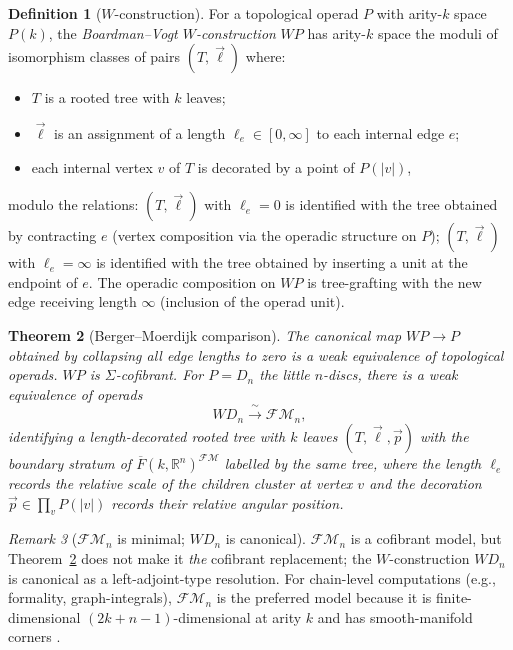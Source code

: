 \documentclass[11pt]{article}
\newtheorem{theorem}{Theorem}[section]
\theoremstyle{definition}
\newtheorem{definition}[theorem]{Definition}
\theoremstyle{remark}
\newtheorem{remark}[theorem]{Remark}
\newcommand{\FMbar}{\overline{F}}
\newcommand{\FM}{\mathcal{FM}}
\newcommand{\Ddisk}{D}
\begin{document}
\begin{definition}[$W$-construction]
\label{def:w-construction}
For a topological operad $P$ with arity-$k$ space $P(k)$, the
\emph{Boardman--Vogt $W$-construction} $W P$ has arity-$k$ space
the moduli of isomorphism classes of pairs $(T, \vec\ell)$ where:
\begin{itemize}
 \item $T$ is a rooted tree with $k$ leaves;
 \item $\vec\ell$ is an assignment of a length $\ell_e \in [0, \infty]$
       to each internal edge $e$;
 \item each internal vertex $v$ of $T$ is decorated by a point of
       $P(|v|)$,
\end{itemize}
modulo the relations: $(T, \vec\ell)$ with $\ell_e = 0$ is identified
with the tree obtained by contracting $e$ (vertex composition via the
operadic structure on $P$); $(T, \vec\ell)$ with $\ell_e = \infty$
is identified with the tree obtained by inserting a unit at the
endpoint of $e$. The operadic composition on $W P$ is tree-grafting
with the new edge receiving length $\infty$ (inclusion of the operad
unit).
\end{definition}

\begin{theorem}[Berger--Moerdijk comparison]
\label{thm:bm-comparison}
\cite[Berger--Moerdijk 2006, Thm 5.1]{BergerMoerdijk2006}
The canonical map $W P \to P$ obtained by collapsing all edge lengths
to zero is a weak equivalence of topological operads. $W P$ is
$\Sigma$-cofibrant. For $P = \Ddisk_n$ the little $n$-discs, there is
a weak equivalence of operads
\[
 W \Ddisk_n \xrightarrow{\ \sim\ } \FM_n,
\]
identifying a length-decorated rooted tree with $k$ leaves
$(T, \vec\ell, \vec p)$ with the boundary stratum of
$\FMbar(k, \mathbb{R}^n)^{\FM}$ labelled by the same tree, where the
length $\ell_e$ records the relative scale of the children cluster
at vertex $v$ and the decoration $\vec p \in \prod_v P(|v|)$ records
their relative angular position.
\end{theorem}

\begin{remark}[$\FM_n$ is minimal; $W \Ddisk_n$ is canonical]
\label{rem:fm-minimal}
$\FM_n$ is a cofibrant model, but Theorem~\ref{thm:bm-comparison}
does not make it \emph{the} cofibrant replacement; the $W$-construction
$W \Ddisk_n$ is canonical as a left-adjoint-type resolution. For
chain-level computations (e.g., formality, graph-integrals), $\FM_n$
is the preferred model because it is finite-dimensional
$(2k + n - 1)$-dimensional at arity $k$ and has smooth-manifold
corners \cite[Sinha 2006]{Sinha2006}.
\end{remark}
\end{document}
